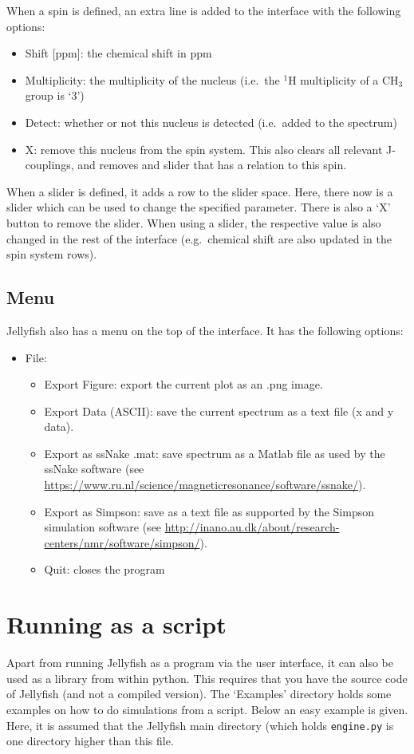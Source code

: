 \documentclass[11pt,a4paper]{article}
\begin{document}
When a spin is defined, an extra line is added to the interface with the following options:

\begin{itemize}
  \item Shift [ppm]: the chemical shift in ppm
  \item Multiplicity: the multiplicity of the nucleus (i.e.\ the $^1$H multiplicity of a CH$_3$ group is
	 `3')
  \item Detect: whether or not this nucleus is detected (i.e.\ added to the spectrum)
  \item X: remove this nucleus from the spin system. This also clears all relevant J-couplings, and
	 removes and slider that has a relation to this spin.
\end{itemize}
  
When a slider is defined, it adds a row to the slider space. Here, there now is a slider which can
be used to change the specified parameter. There is also a `X' button to remove the slider. When
using a slider, the respective value is also changed in the rest of the interface (e.g.\ chemical
shift are also updated in the spin system rows).


\subsection{Menu}
Jellyfish also has a menu on the top of the interface. It has the following options:

\begin{itemize}
  \item File:
\begin{itemize}
  \item Export Figure: export the current plot as an .png image.
  \item Export Data (ASCII): save the current spectrum as a text file (x and y data).
  \item Export as ssNake .mat: save spectrum as a Matlab file as used by the ssNake software (see
	 \url{https://www.ru.nl/science/magneticresonance/software/ssnake/}).
  \item Export as Simpson: save as a text file as supported by the Simpson simulation software
	 (see \url{http://inano.au.dk/about/research-centers/nmr/software/simpson/}).
  \item Quit: closes the program
\end{itemize}
\end{itemize}

\section{Running as a script}
Apart from running Jellyfish as a program via the user interface, it can also be used as a library
from within python. This requires that you have the source code of Jellyfish (and not a compiled
version). The `Examples' directory holds some examples on how to do simulations from a script. Below
an easy example is given. Here, it is assumed that the Jellyfish main directory (which holds
\texttt{engine.py} is one directory higher than this file.
\end{document}
